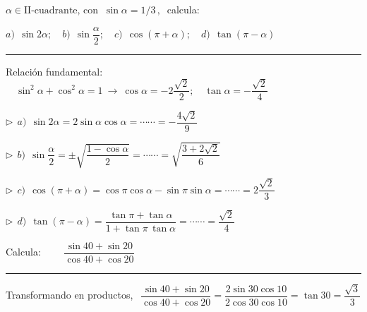 \begin{miejercicio}

$\alpha \in \text{II-cuadrante, con } \ \sin \alpha=1/3\, , \ $ calcula:

\vspace{2mm} \hspace{2cm} $a)\ \ \sin 2 \alpha;\quad b)\ \  \sin \dfrac \alpha 2 ;\quad c)\ \ \cos (\pi+\alpha) ;\quad d)\ \ \tan(\pi-\alpha)$

\rule{250pt}{0.1pt}

\vspace{4mm} Relación fundamental: $\quad \sin^2 \alpha + \cos^2 \alpha = 1 \ \to \ \cos \alpha=-2\dfrac{\sqrt{2}}{2}; \quad \tan \alpha=-\dfrac{\sqrt{2}}{4}$

\vspace{4mm} $\triangleright \ \ a)\ \ \sin 2 \alpha= 2\sin \alpha \cos \alpha= \cdots \cdots = -\dfrac{4\sqrt{2}}{9}$
	


\vspace{4mm} $\triangleright \ \ b)\ \ \sin \dfrac \alpha 2 = \pm \sqrt{\dfrac{1-\cos \alpha}{2}}= \cdots \cdots = \sqrt{\dfrac{3+2\sqrt{2}}{6}}$



\vspace{4mm} $\triangleright \ \ c)\ \ \cos (\pi+\alpha)= \cos \pi \cos \alpha -\sin \pi \sin \alpha= \cdots \cdots = 2\dfrac{\sqrt{2}}{3}$



\vspace{4mm} $\triangleright \ \ d)\ \ \tan (\pi-\alpha)= \dfrac{\tan \pi + \tan \alpha}{1+\tan \pi \, \tan \alpha}=\cdots \cdots =\dfrac{\sqrt{2}}{4}$




\end{miejercicio}


\begin{miejercicio}

Calcula: $\qquad \dfrac{\sin 40 + \sin 20}{\cos 40 + \cos 20}$

\rule{250pt}{0.1pt}

\vspace{4mm}
	
Transformando en productos, $\ \ \dfrac{\sin 40 + \sin 20}{\cos 40 + \cos 20}= \dfrac{2\sin 30 \cos 10}{2\cos 30 \cos 10}=\tan 30= \dfrac{\sqrt{3}}{3}$
\end{miejercicio}


